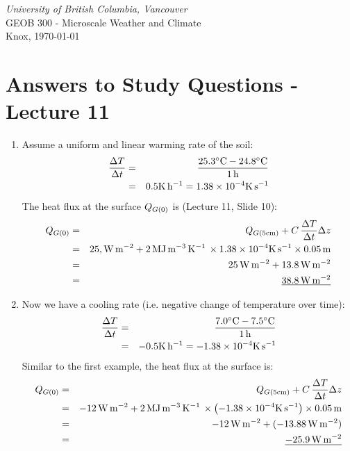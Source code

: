 \documentclass[11pt]{article}
\author{Andy Black and Andreas Christen}
\begin{document}
\begin{center}
\emph{University of British Columbia, Vancouver}\\
GEOB 300 - Microscale Weather and Climate\\
Knox, \today
\section*{Answers to Study Questions - Lecture 11}
\end{center}

\begin{enumerate}

\item Assume a uniform and linear warming rate of the soil:
\begin{eqnarray*} 
\frac{\Delta T}{\Delta t}&=& \frac{25.3^{\circ}\rm{C} - 24.8^{\circ}\rm{C}}{1\,\rm{h}} \\
&=& 0.5\rm{K}\,\rm{h}^{-1} = 1.38 \times 10^{-4}\rm{K}\,\rm{s}^{-1} 
\end{eqnarray*} 
The heat flux at the surface $Q_{G(\rm{0})}$ is (Lecture 11, Slide 10):
\begin{eqnarray*} 
Q_{G(\rm{0})} &=& Q_{G(\rm{5cm})} + C\, \frac{\Delta T}{\Delta t} \Delta z \\
&=& 25,\rm{W}\,\rm{m}^{-2} + 2 \,\rm{MJ}\,\rm{m}^{-3}\,\rm{K}^{-1}\, \times 1.38 \times 10^{-4}\rm{K}\,\rm{s}^{-1}  \times 0.05\,\rm{m} \\
&=& 25\,\rm{W}\,\rm{m}^{-2} + 13.8\,\rm{W}\,\rm{m}^{-2} \\
&=& \underline{38.8\,\rm{W}\,\rm{m}^{-2}} \\
\end{eqnarray*} 
\item Now we have a cooling rate (i.e. negative change of temperature over time):
\begin{eqnarray*} 
\frac{\Delta T}{\Delta t}&=& \frac{7.0^{\circ}\rm{C} - 7.5^{\circ}\rm{C}}{1\,\rm{h}} \\
&=& -0.5\rm{K}\,\rm{h}^{-1} = -1.38 \times 10^{-4}\rm{K}\,\rm{s}^{-1} 
\end{eqnarray*} 
Similar to the first example, the heat flux at the surface is:
\begin{eqnarray*} 
Q_{G(\rm{0})} &=& Q_{G(\rm{5cm})} + C\, \frac{\Delta T}{\Delta t} \Delta z \\
&=& -12\,\rm{W}\,\rm{m}^{-2} + 2 \,\rm{MJ}\,\rm{m}^{-3}\,\rm{K}^{-1}\, \times \left( -1.38 \times 10^{-4}\rm{K}\,\rm{s}^{-1} \right) \times 0.05\,\rm{m} \\
&=& -12\,\rm{W}\,\rm{m}^{-2} + (-13.88\,\rm{W}\,\rm{m}^{-2})  \\
&=& \underline{-25.9\,\rm{W}\,\rm{m}^{-2}} \\
\end{eqnarray*} 


\end{enumerate}
\end{document}
